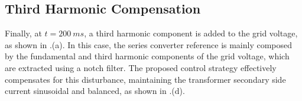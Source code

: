 \subsection{Third Harmonic Compensation}
Finally, at $t = 200\ ms$, a third harmonic component is added to the grid voltage, as shown in .(a). In this case, the series converter reference is mainly composed by the fundamental and third harmonic components of the grid voltage, which are extracted using a notch filter. The proposed control strategy effectively compensates for this disturbance, maintaining the transformer secondary side current sinusoidal and balanced, as shown in .(d).